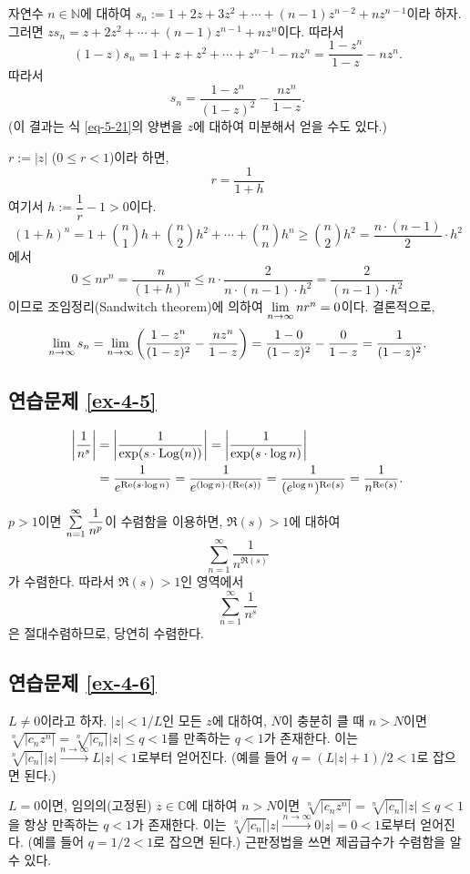 자연수 $n\in\mathbb N$에 대하여 
$s_n:= 1+2z + 3z^2 + \cdots + (n-1)z^{n-2} + nz^{n-1}$이라 하자.
그러면 $zs_n = z + 2z^2 + \cdots + (n-1)z^{n-1} + nz^n$이다.
따라서
\[
(1-z)s_n= 1 + z + z^2 + \cdots + z^{n-1} - nz^n
= \dfrac{1-z^n}{1-z}  - nz^n.
\]
따라서
\[
s_n = \dfrac{1-z^n}{(1-z)^2}  - \dfrac{nz^n}{1-z}.
\]
(이 결과는 식 \eqref{eq-5-21}의 양변을 $z$에 대하여 미분해서 얻을 수도 있다.)

$r:=|z|$ ($0\le r < 1$)이라 하면,
\[
r = \dfrac1{1+h}
\]
여기서 $h:=\dfrac1r-1>0$이다.
\[
(1+h)^n = 1 + {n\choose 1}h + {n \choose 2}h^2 + \cdots
+ {n \choose n}h^n \ge {n \choose 2}h^2 = \dfrac{n\cdot(n-1)}2 \cdot h^2
\]
에서
\[
0\le nr^n = \dfrac n{(1+h)^n} \le n \cdot \dfrac2{n\cdot(n-1)\cdot h^2}
= \dfrac 2{(n-1)\cdot h^2}
\]
이므로
조임정리(Sandwitch theorem)에 의하여 $\lim\limits_{n\to\infty} nr^n = 0$이다.
결론적으로,
\[
\lim\limits_{n\to\infty}  s_n = \lim\limits_{n\to\infty} \left( \displaystyle\frac{1-z^n}{(1-z)^2}
- \displaystyle\frac{nz^n}{1-z} \right)
= \displaystyle\frac{1-0}{(1-z)^2} - \displaystyle\frac0{1-z} = \displaystyle\frac1{(1-z)^2}.
\]

\subsection*{연습문제 \ref{ex-4-5}}

\begin{align*}
\left| \displaystyle\frac1{n^s} \right| &= \left| \displaystyle\frac1{\exp(s\cdot \mathop{\mathrm{Log}}(n))} \right|
= \left| \displaystyle\frac1{\exp(s\cdot\log n)}\right| \\
&= \displaystyle\frac1{e^{\Re(s\cdot \log n)}} = \displaystyle\frac1{e^{(\log n)\cdot(\Re(s))}}
= \displaystyle\frac1{(e^{\log n})^{\Re(s)}} = \displaystyle\frac1{n^{\Re(s)}}.
\end{align*}

$p>1$이면 $\sum\limits_{n=1}^\infty \displaystyle\frac1{n^p}$이 수렴함을 이용하면,
$\Re(s)>1$에 대하여
\[
\sum_{n=1}^\infty \dfrac1{n^{\Re(s)}}
\]
가 수렴한다. 따라서  $\Re(s)>1$인 영역에서
\[
\sum_{n=1}^\infty \dfrac1{n^{s}}
\]
은 절대수렴하므로, 당연히 수렴한다.

\subsection*{연습문제 \ref{ex-4-6}}

$L\ne0$이라고 하자.
$|z|< 1/L$인 모든 $z$에 대하여, 
$N$이 충분히 클 때 $n>N$이면
$\sqrt[n]{|c_nz^n|}  = \sqrt[n]{|c_n|}|z| \le q <1$를 만족하는 $q<1$가 존재한다.
이는 $\sqrt[n]{|c_n|}|z| \stackrel{n\to\infty}{\longrightarrow}L|z|<1$로부터 얻어진다.
(예를 들어 $q=(L|z|+1)/2 <1$로 잡으면 된다.)

$L=0$이면, 
임의의(고정된) $z\in \mathbb C$에 대하여
$n>N$이면 $\sqrt[n]{|c_nz^n|} = \sqrt[n]{|c_n|}|z| \le q < 1$을 항상 만족하는 $q<1$가 존재한다.
이는 $\sqrt[n]{|c_n|}|z| \stackrel{n\to\infty}{\longrightarrow}0|z|=0<1$로부터 얻어진다.
(예를 들어 $q=1/2<1$로 잡으면 된다.)
근판정법을 쓰면 제곱급수가 수렴함을 알 수 있다.

